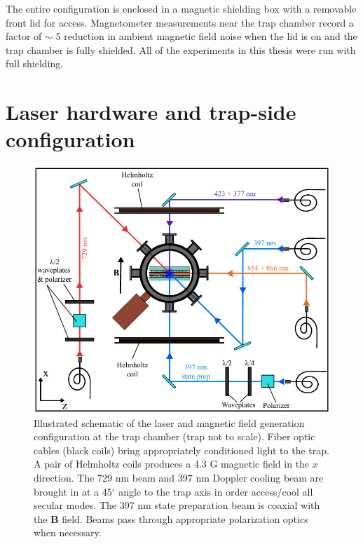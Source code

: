 The entire configuration is enclosed in a magnetic shielding box with a removable front lid for access. Magnetometer measurements near the trap chamber record a factor of $\sim$ 5 reduction in ambient magnetic field noise when the lid is on and the trap chamber is fully shielded. All of the experiments in this thesis were run with full shielding. 








\section{Laser hardware and trap-side configuration}

\begin{figure}[ht]
    \begin{center}
        \includegraphics{figures/3/Fig_lasers5}
        \caption{\label{fig:LaserConfig} Illustrated schematic of the laser and magnetic field generation configuration at the trap chamber (trap not to scale). Fiber optic cables (black coils) bring appropriately conditioned light to the trap. A pair of Helmholtz coils produces a 4.3 G magnetic field in the $x$ direction. The 729 nm beam and 397 nm Doppler cooling beam are brought in at a 45$^{\circ}$ angle to the trap axis in order access/cool all secular modes. The 397 nm state preparation beam is coaxial with the $\mathbf{B}$ field. Beams pass through appropriate polarization optics when necessary. }
    \end{center}
\end{figure}


